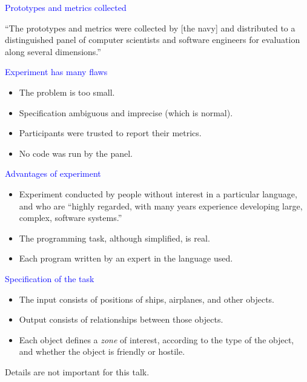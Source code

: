\documentclass{slides}
\newcommand{\ti}[1]{\begin{center}\Large{\textcolor{blue}{#1}}\end{center}}
\begin{document}
\begin{slide}\ti{Prototypes and metrics collected}

``The prototypes and metrics were collected by [the navy] and
  distributed to a distinguished panel of computer scientists and
  software engineers for evaluation along several dimensions.''

\vfill\end{slide}
\begin{slide}\ti{Experiment has many flaws}

  \begin{itemize}
  \item The problem is too small.
  \item Specification ambiguous and imprecise (which is normal).
  \item Participants were trusted to report their metrics.
  \item No code was run by the panel.
  \end{itemize}

\vfill\end{slide}
\begin{slide}\ti{Advantages of experiment}

  \begin{itemize}
  \item Experiment conducted by people without interest in a
    particular language, and who are ``highly regarded, with many
    years experience developing large, complex, software systems.''
  \item The programming task, although simplified, is real.
  \item Each program written by an expert in the language used.
  \end{itemize}

\vfill\end{slide}
\begin{slide}\ti{Specification of the task}

  \begin{itemize}
  \item The input consists of positions of ships, airplanes, and other
    objects.
  \item Output consists of relationships between those objects.
  \item Each object defines a \emph{zone} of interest, according to
    the type of the object, and whether the object is friendly or
    hostile.
  \end{itemize}

Details are not important for this talk.

\vfill\end{slide}
\end{document}

